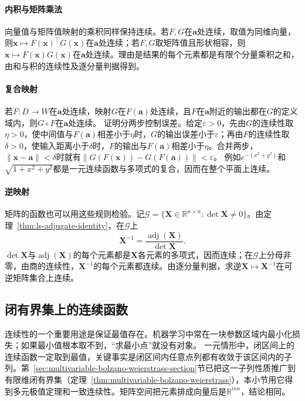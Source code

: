 \paragraph{内积与矩阵乘法}
向量值与矩阵值映射的乘积同样保持连续。若$F,G$在$\bm a$处连续，取值为同维向量，则$\bm x\mapsto F(\bm x)^\top G(\bm x)$在$\bm a$处连续；若$F,G$取矩阵值且形状相容，则$\bm x\mapsto F(\bm x)G(\bm x)$在$\bm a$处连续。理由是结果的每个元素都是有限个分量乘积之和，由和与积的连续性及逐分量判据得到。

\paragraph{复合映射}
若$F:D\to W$在$\bm a$处连续，映射$G$在$F(\bm a)$处连续，且$F$在$\bm a$附近的输出都在$G$的定义域内，则$G\circ F$在$\bm a$处连续。
证明分两步控制误差。给定$\varepsilon>0$，先由$G$的连续性取$\eta>0$，使中间值与$F(\bm a)$相差小于$\eta$时，$G$的输出误差小于$\varepsilon$；再由$F$的连续性取$\delta>0$，使输入距离小于$\delta$时，$F$的输出与$F(\bm a)$相差小于$\eta$。合并两步，$\lVert\bm x-\bm a\rVert<\delta$时就有$\lVert G(F(\bm x))-G(F(\bm a))\rVert<\varepsilon$。
例如$e^{-(x^2+y^2)}$和$\sqrt{1+x^2+y^2}$都是一元连续函数与多项式的复合，因而在整个平面上连续。

\paragraph{逆映射}
矩阵的函数也可以用这些规则检验。记$\mathcal G=\{\bm X\in\mathbb R^{n\times n}:\det\bm X\neq0\}$。由定理~\ref{thm:ls-adjugate-identity}，在$\mathcal G$上
\[
 \bm X^{-1}=\frac{\operatorname{adj}(\bm X)}{\det\bm X}.
\]
$\det\bm X$与$\operatorname{adj}(\bm X)$的每个元素都是$\bm X$各元素的多项式，因而连续；在$\mathcal G$上分母非零，由商的连续性，$\bm X^{-1}$的每个元素都连续。由逐分量判据，求逆$\bm X\mapsto\bm X^{-1}$在可逆矩阵集合上连续。

\subsection{闭有界集上的连续函数}
\label{sec:multivariable-closed-bounded-continuous}

连续性的一个重要用途是保证最值存在。机器学习中常在一块参数区域内最小化损失；如果最小值根本取不到，“求最小点”就没有对象。
一元情形中，闭区间上的连续函数一定取到最值，关键事实是闭区间内任意点列都有收敛于该区间内的子列。第~\ref{sec:multivariable-bolzano-weierstrass-section}节已把这一子列性质推广到有限维闭有界集（定理~\ref{thm:multivariable-bolzano-weierstrass}），本小节用它得到多元极值定理和一致连续性。矩阵空间把元素排成向量后是$\mathbb R^{mn}$，结论相同。

